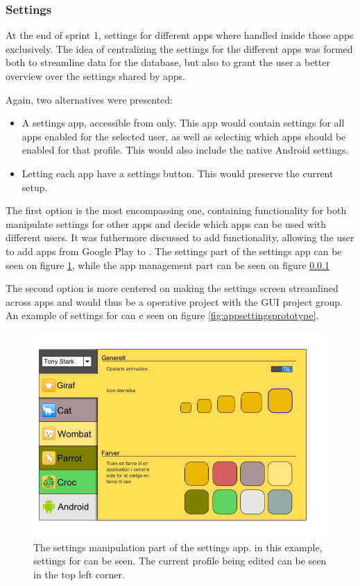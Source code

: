 \subsubsection{Settings}

At the end of sprint 1, settings for different apps where handled inside those apps exclusively.
The idea of centralizing the settings for the different apps was formed both to streamline data for the database, but also to grant the user a better overview over the settings shared by apps.

Again, two alternatives were presented:

\begin{itemize}
\item A settings app, accessible from \launcher only.
This app would contain settings for all apps enabled for the selected user, as well as selecting which apps should be enabled for that profile.
This would also include the native Android settings.
\item Letting each app have a settings button.
This would preserve the current setup.
\end{itemize}

The first option is the most encompassing one, containing functionality for both manipulate settings for other apps and decide which apps can be used with different users.
It was futhermore discussed to add functionality, allowing the user to add apps from Google Play to \launcher.
The settings part of the settings app can be seen on figure \ref{fig:settingsprototype}, while the app management part can be seen on figure \ref{}

The second option is more centered on making the settings screen streamlined across apps and would thus be a operative project with the GUI project group.
An example of settings for \launcher can e seen on figure \ref{fig:appsettingsprototype}.

\begin{figure}[p]
    \includegraphics[width=\textwidth]{figures/sprint2/settings}
    \caption{The settings manipulation part of the settings app. in this example, settings for \launcher can be seen. The current profile being edited can be seen in the top left corner.}
    \label{fig:settingsprototype}
\end{figure}

